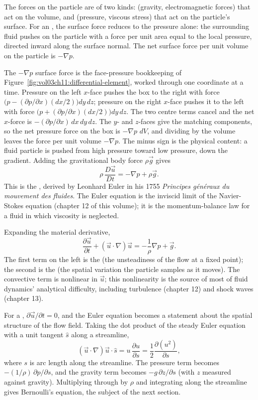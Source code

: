 The forces on the particle are of two kinds: 
(gravity, electromagnetic forces) that act on the volume, and
 (pressure, viscous stress) that act on the
particle's surface. For an , the surface
force reduces to the pressure alone: the surrounding fluid pushes
on the particle with a force per unit area equal to the local
pressure, directed inward along the surface normal. The net surface
force per unit volume on the particle is $-\nabla p$.



The $-\nabla p$ surface force is the face-pressure bookkeeping of
Figure~\ref{fig:vol03ch11:differential-element}, worked through one
coordinate at a time. Pressure on the left $x$-face pushes the box to
the right with force $\big(p - (\partial p/\partial x)(dx/2)\big)dy\,dz$;
pressure on the right $x$-face pushes it to the left with force
$\big(p + (\partial p/\partial x)(dx/2)\big)dy\,dz$. The two centre
terms cancel and the net $x$-force is $-(\partial p/\partial x)\,
dx\,dy\,dz$. The $y$- and $z$-faces give the matching components, so
the net pressure force on the box is $-\nabla p\,\,dV$, and dividing by
the volume leaves the force per unit volume $-\nabla p$. The minus sign
is the physical content: a fluid particle is pushed from high pressure
toward low pressure, down the gradient. Adding the gravitational body
force $\rho \vec{g}$ gives
\[
\rho\,\frac{D\vec{u}}{Dt} = -\nabla p + \rho\vec{g}.
\]
This is the , derived by Leonhard Euler in
his 1755 \emph{Principes g\'en\'eraux du mouvement des fluides}.
The Euler equation is the inviscid limit of the Navier-Stokes
equation (chapter 12 of this volume); it is the momentum-balance
law for a fluid in which viscosity is neglected.

Expanding the material derivative,
\[
\frac{\partial \vec{u}}{\partial t}
+ (\vec{u}\cdot\nabla)\vec{u}
= -\frac{1}{\rho}\nabla p + \vec{g}.
\]
The first term on the left is the  (the
unsteadiness of the flow at a fixed point); the second is the
 (the spatial variation the
particle samples as it moves). The convective term is nonlinear in
$\vec{u}$; this nonlinearity is the source of most of fluid
dynamics' analytical difficulty, including turbulence (chapter 12)
and shock waves (chapter 13).

For a , $\partial \vec{u}/\partial t = 0$, and
the Euler equation becomes a statement about the spatial structure
of the flow field. Taking the dot product of the steady Euler
equation with a unit tangent $\hat{s}$ along a streamline,
\[
(\vec{u}\cdot\nabla)\vec{u}\cdot\hat{s}
= u\,\frac{\partial u}{\partial s}
= \frac{1}{2}\frac{\partial(u^2)}{\partial s},
\]
where $s$ is arc length along the streamline. The pressure term
becomes $-(1/\rho)\,\partial p/\partial s$, and the gravity term
becomes $-g\,\partial z/\partial s$ (with $z$ measured against
gravity). Multiplying through by $\rho$ and integrating along the
streamline gives Bernoulli's equation, the subject of the next
section.

